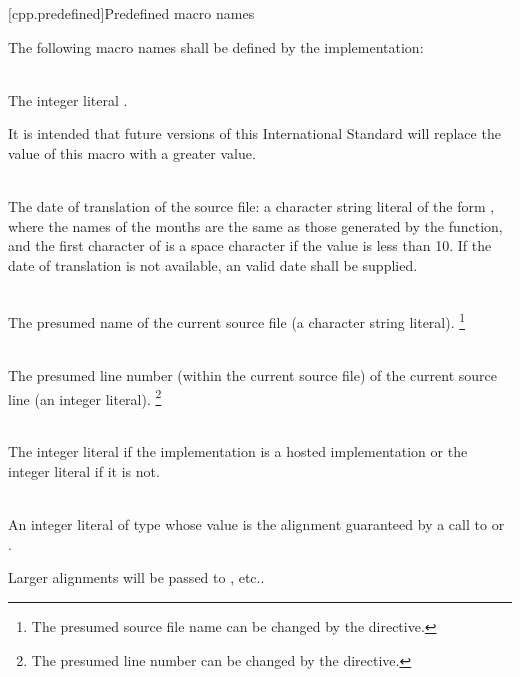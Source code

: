 [cpp.predefined]{Predefined macro names}
%

\pnum
The following macro names shall be defined by the implementation:

\begin{description}

\item
{}%
\\
The integer literal \tcode{\cppver}.
\begin{note}
It is intended that future
versions of this International Standard will
replace the value of this macro with a greater value.
\end{note}

\item
{}%
\\
The date of translation of the source file:
a character string literal of the form
,
where the names of the months are the same as those generated
by the
function,
and the first character of
is a space character if the value is less than 10.
If the date of translation is not available,
an  valid date
shall be supplied.

\item
{}%
\\
The presumed name of the current source file (a character string
literal).%
\footnote{The presumed source file name can be changed by the  directive.}

\item
{}%
\\
The presumed line number (within the current source file) of the current source line
(an integer literal).%
\footnote{The presumed line number can be changed by the  directive.}

\item
{}%
\\
The integer literal  if the implementation is a hosted
implementation or the integer literal  if it is not.

\item
{}%
\\
An integer literal of type 
whose value is the alignment guaranteed
by a call to 
or .
\begin{note}
Larger alignments will be passed to
, etc..
\end{note}


\end{description}
